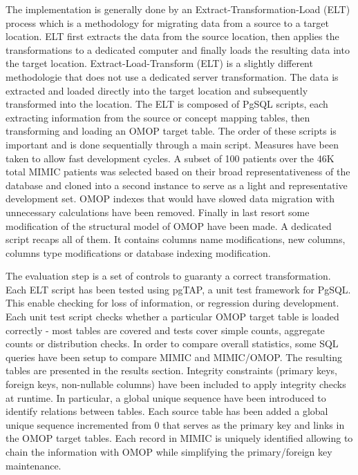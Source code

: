 The implementation is generally done by an Extract-Transformation-Load (ELT)
process which is a methodology for migrating data from a source to a target
location. ELT first extracts the data from the source location, then applies
the transformations to a dedicated computer and finally loads the resulting
data into the target location. Extract-Load-Transform (ELT) is a slightly
different methodologie that does not use a dedicated server transformation.
The data is extracted and loaded directly into the target location and
subsequently transformed into the location. The ELT is composed of PgSQL
scripts, each extracting information from the source or concept mapping tables,
then transforming and loading an OMOP target table. The order of these scripts
is important and is done sequentially through a main script. 
Measures have been taken to allow fast development cycles. A subset of 100
patients over the 46K total MIMIC patients was selected based on their broad
representativeness of the database and cloned into a second instance to serve
as a light and representative development set. OMOP indexes that would have
slowed data migration with unnecessary calculations have been removed.
Finally in last resort some modification of the structural model of OMOP have
been made. A dedicated script recaps all of them. It contains columns name
modifications, new columns, columns type modifications or database indexing
modification.

The evaluation step is a set of controls to guaranty a correct transformation.
Each ELT script has been tested using pgTAP, a unit test framework for PgSQL.
This enable checking for loss of information, or regression during development.
Each unit test script checks whether a particular OMOP target table is loaded
correctly - most tables are covered and tests cover simple counts, aggregate
counts or distribution checks.
In order to compare overall statistics, some SQL queries have been setup to
compare MIMIC and MIMIC/OMOP. The resulting tables are presented in the results
section. Integrity constraints (primary keys, foreign keys, non-nullable
columns) have been included to apply integrity checks at runtime. 
In particular, a global unique sequence have been introduced to identify
relations between tables. Each source table has been added a global unique
sequence incremented from 0 that serves as the primary key and links in the
OMOP target tables. Each record in MIMIC is uniquely identified allowing to
chain the information with OMOP while simplifying the primary/foreign key
maintenance.
\\


